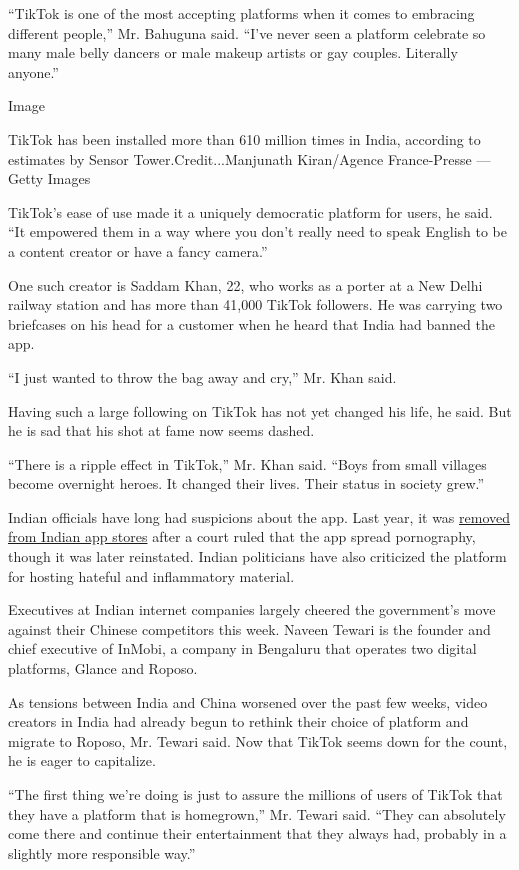 ``TikTok is one of the most accepting platforms when it comes to
embracing different people,'' Mr. Bahuguna said. ``I've never seen a
platform celebrate so many male belly dancers or male makeup artists or
gay couples. Literally anyone.''

Image

 TikTok has been installed more than 610 million times in India,
according to estimates by Sensor Tower.Credit...Manjunath Kiran/Agence
France-Presse --- Getty Images

TikTok's ease of use made it a uniquely democratic platform for users,
he said. ``It empowered them in a way where you don't really need to
speak English to be a content creator or have a fancy camera.''

One such creator is Saddam Khan, 22, who works as a porter at a New
Delhi railway station and has more than 41,000 TikTok followers. He was
carrying two briefcases on his head for a customer when he heard that
India had banned the app.

``I just wanted to throw the bag away and cry,'' Mr. Khan said.

Having such a large following on TikTok has not yet changed his life, he
said. But he is sad that his shot at fame now seems dashed.

``There is a ripple effect in TikTok,'' Mr. Khan said. ``Boys from small
villages become overnight heroes. It changed their lives. Their status
in society grew.''

Indian officials have long had suspicions about the app. Last year, it
was
\href{https://www.nytimes3xbfgragh.onion/2019/04/17/business/india-tiktok-children-privacy.html}{removed
from Indian app stores} after a court ruled that the app spread
pornography, though it was later reinstated. Indian politicians have
also criticized the platform for hosting hateful and inflammatory
material.

Executives at Indian internet companies largely cheered the government's
move against their Chinese competitors this week. Naveen Tewari is the
founder and chief executive of InMobi, a company in Bengaluru that
operates two digital platforms, Glance and Roposo.

As tensions between India and China worsened over the past few weeks,
video creators in India had already begun to rethink their choice of
platform and migrate to Roposo, Mr. Tewari said. Now that TikTok seems
down for the count, he is eager to capitalize.

``The first thing we're doing is just to assure the millions of users of
TikTok that they have a platform that is homegrown,'' Mr. Tewari said.
``They can absolutely come there and continue their entertainment that
they always had, probably in a slightly more responsible way.''

